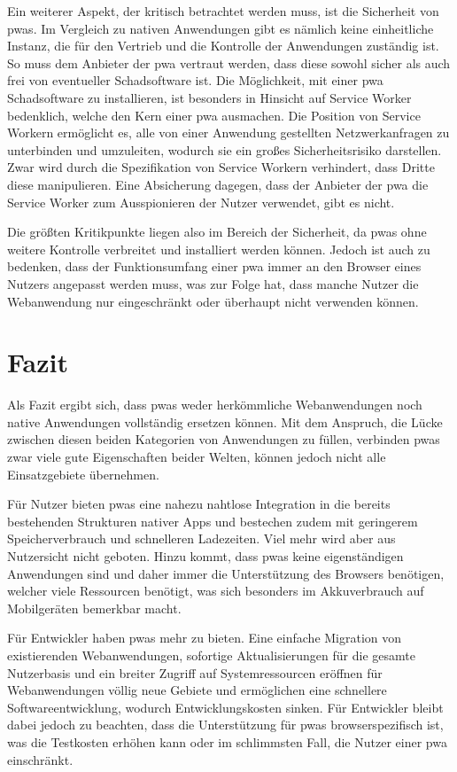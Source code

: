 \documentclass[12pt, parskip=half]{scrartcl}       %
\begin{document}
Ein weiterer Aspekt, der kritisch betrachtet werden muss, ist die Sicherheit von \acp{pwa}.
Im Vergleich zu nativen Anwendungen gibt es nämlich keine einheitliche Instanz, die für den Vertrieb und die Kontrolle der Anwendungen zuständig ist.
So muss dem Anbieter der \ac{pwa} vertraut werden, dass diese sowohl sicher als auch frei von eventueller Schadsoftware ist.
Die Möglichkeit, mit einer \ac{pwa} Schadsoftware zu installieren, ist besonders in Hinsicht auf Service Worker bedenklich, welche den Kern einer \ac{pwa} ausmachen.
Die Position von Service Workern ermöglicht es, alle von einer Anwendung gestellten Netzwerkanfragen zu unterbinden und umzuleiten, wodurch sie ein großes Sicherheitsrisiko darstellen.
Zwar wird durch die Spezifikation von Service Workern verhindert, dass Dritte diese manipulieren.
Eine Absicherung dagegen, dass der Anbieter der \ac{pwa} die Service Worker zum Ausspionieren der Nutzer verwendet, gibt es nicht.

Die größten Kritikpunkte liegen also im Bereich der Sicherheit, da \acp{pwa} ohne weitere Kontrolle verbreitet und installiert werden können.
Jedoch ist auch zu bedenken, dass der Funktionsumfang einer \ac{pwa} immer an den Browser eines Nutzers angepasst werden muss, was zur Folge hat, dass manche Nutzer die Webanwendung nur eingeschränkt oder überhaupt nicht verwenden können.

\newpage

\section{Fazit}
\label{sec:fazit}

Als Fazit ergibt sich, dass \acp{pwa} weder herkömmliche Webanwendungen noch native Anwendungen vollständig ersetzen können.
Mit dem Anspruch, die Lücke zwischen diesen beiden Kategorien von Anwendungen zu füllen, verbinden \acp{pwa} zwar viele gute Eigenschaften beider Welten, können jedoch nicht alle Einsatzgebiete übernehmen.

Für Nutzer bieten \acp{pwa} eine nahezu nahtlose Integration in die bereits bestehenden Strukturen nativer Apps und bestechen zudem mit geringerem Speicherverbrauch und schnelleren Ladezeiten.
Viel mehr wird aber aus Nutzersicht nicht geboten.
Hinzu kommt, dass \acp{pwa} keine eigenständigen Anwendungen sind und daher immer die Unterstützung des Browsers benötigen, welcher viele Ressourcen benötigt, was sich besonders im Akkuverbrauch auf Mobilgeräten bemerkbar macht.

Für Entwickler haben \acp{pwa} mehr zu bieten.
Eine einfache Migration von existierenden Webanwendungen, sofortige Aktualisierungen für die gesamte Nutzerbasis und ein breiter Zugriff auf Systemressourcen eröffnen für Webanwendungen völlig neue Gebiete und ermöglichen eine schnellere Softwareentwicklung, wodurch Entwicklungskosten sinken.
Für Entwickler bleibt dabei jedoch zu beachten, dass die Unterstützung für \acp{pwa} browserspezifisch ist, was die Testkosten erhöhen kann oder im schlimmsten Fall, die Nutzer einer \ac{pwa} einschränkt.
\end{document}
